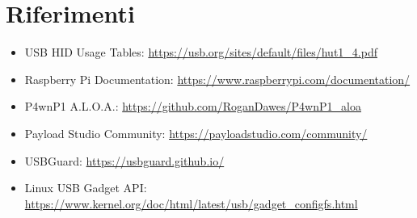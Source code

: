 \documentclass[12pt,a4paper]{article}
\begin{document}
\section{Riferimenti}
\begin{itemize}
    \item USB HID Usage Tables: \url{https://usb.org/sites/default/files/hut1_4.pdf}
    \item Raspberry Pi Documentation: \url{https://www.raspberrypi.com/documentation/}
    \item P4wnP1 A.L.O.A.: \url{https://github.com/RoganDawes/P4wnP1_aloa}
    \item Payload Studio Community: \url{https://payloadstudio.com/community/}
    \item USBGuard: \url{https://usbguard.github.io/}
    \item Linux USB Gadget API: \url{https://www.kernel.org/doc/html/latest/usb/gadget_configfs.html}
\end{itemize}
\end{document}
